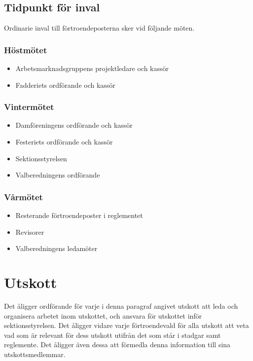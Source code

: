 \documentclass{datateknologsektionen-document}
\begin{document}
\subsection{Tidpunkt för inval}
Ordinarie inval till förtroendeposterna sker vid följande möten.

\subsubsection{Höstmötet}
\begin{itemize}
  \item Arbetsmarknadsgruppens projektledare och kassör
  \item Fadderiets ordförande och kassör
\end{itemize}

\subsubsection{Vintermötet}
\begin{itemize}
  \item Damföreningens ordförande och kassör
  \item Festeriets ordförande och kassör
  \item Sektionsstyrelsen
  \item Valberedningens ordförande
\end{itemize}

\subsubsection{Vårmötet}
\begin{itemize}
  \item Resterande förtroendeposter i reglementet
  \item Revisorer
  \item Valberedningens ledamöter
\end{itemize}

\section{Utskott}
Det åligger ordförande för varje i denna paragraf angivet utskott att leda och organisera arbetet inom utskottet, och
ansvara för utskottet inför sektionsstyrelsen. Det åligger vidare varje förtroendevald
för alla utskott att veta vad som är relevant för dess utskott utifrån det som står i
stadgar samt reglemente. Det åligger även dessa att förmedla denna information till
sina utskottsmedlemmar.
\end{document}
